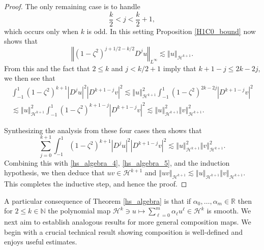 \documentclass[11pt,reqno]{amsart}
\numberwithin{equation}{section}
\providecommand{\abs}[1]{\left\vert#1\right\vert}
\providecommand{\norm}[1]{\left\Vert#1\right\Vert}
\def\ls{\lesssim}
\providecommand{\abs}[1]{\left\vert#1\right\vert}
\providecommand{\norm}[1]{\left\Vert#1\right\Vert}
\def\ls{\lesssim}
\def\h{\mathcal{H}}
\def\N{\mathbb{N}}
\def\R{\mathbb{R}}
\begin{document}
\begin{proof}
The only remaining case is to handle 
\begin{equation}
 \frac{k}{2} < j < \frac{k}{2} + 1,
\end{equation}
which occurs only when $k$ is odd.  In this setting Proposition \ref{H1C0_bound} now shows that 
\begin{equation}
  \norm{(1-\zeta^2)^{j+1/2 -k/2} D^j u}_{L^\infty} \ls \norm{u}_{\h^{k+1}}.
\end{equation}
From this and the fact that $2 \le k$ and $j < k/2 +1$ imply that $k+1-j \le 2k-2j$, we then see that
\begin{multline}
  \int_{-1}^1 (1-\zeta^2)^{k+1} \abs{D^j u}^2  \abs{D^{k+1-j} v}^2 \ls \norm{u}_{\h^{k+1}}^2  \int_{-1}^1 (1-\zeta^2)^{2k-2j}   \abs{D^{k+1-j} v}^2  \\
\ls \norm{u}_{\h^{k+1}}^2  \int_{-1}^1 (1-\zeta^2)^{k+1-j}   \abs{D^{k+1-j} v}^2 \ls \norm{u}_{\h^{k+1}}^2  \norm{v}_{\h^{k+1}}^2. 
\end{multline}


Synthesizing the analysis from these four cases then shows that
\begin{equation}
  \sum_{j=0}^{k+1} \int_{-1}^1 (1-\zeta^2)^{k+1} \abs{D^j u}^2  \abs{D^{k+1-j} v}^2 \ls \norm{u}_{\h^{k+1}}^2  \norm{v}_{\h^{k+1}}^2.
\end{equation}
Combining this with \eqref{hs_algebra_4}, \eqref{hs_algebra_5}, and the induction hypothesis, we then deduce that $uv \in \h^{k+1}$ and $\norm{uv}_{\h^{k+1}} \ls \norm{u}_{\h^{k+1}}  \norm{v}_{\h^{k+1}}$.  This completes the inductive step, and hence the proof.
\end{proof}

  
A particular consequence of Theorem \ref{hs_algebra} is that if $\alpha_0,\dotsc,\alpha_m \in \R$ then for $2\le k \in \N$  the polynomial map  $\h^k \ni u \mapsto \sum_{\ell=0}^m \alpha_\ell u^\ell \in \h^k$ is smooth.  We next aim to establish analogous results for more general composition maps.  We begin with a crucial technical result showing composition is well-defined and enjoys useful estimates.
 
\end{document}

